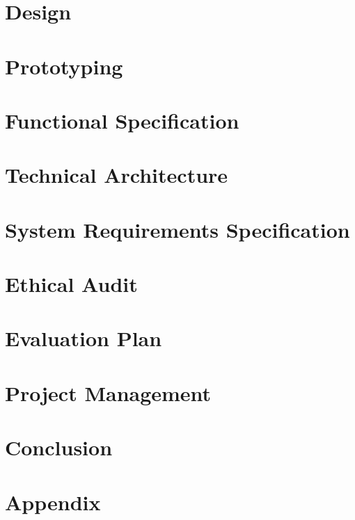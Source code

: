 \documentclass[12pt]{report}
\begin{document}
\chapter{Design}


\chapter{Prototyping}


\chapter{Functional Specification}


\chapter{Technical Architecture}


\chapter{System Requirements Specification}


\chapter{Ethical Audit}


\chapter{Evaluation Plan}


\chapter{Project Management}


\chapter{Conclusion}


\appendix
\chapter{Appendix}
\begin{appendices}

\end{appendices}

%


\end{document}
